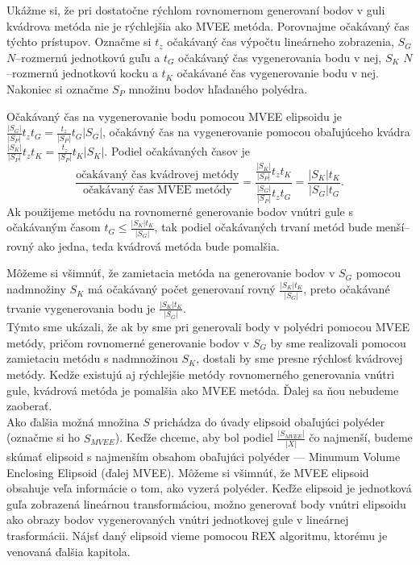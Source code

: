 Ukážme si, že pri dostatočne rýchlom rovnomernom generovaní bodov v guli kvádrova metóda nie je rýchlejšia ako MVEE metóda. Porovnajme očakávaný čas týchto prístupov. Označme si $t_z$ očakávaný čas výpočtu lineárneho zobrazenia, $S_G$ $N$--rozmernú jednotkovú guľu a $t_G$ očakávaný čas vygenerovania bodu v nej, $S_K$ $N$--rozmernú jednotkovú kocku a $t_K$ očakávané čas vygenerovanie bodu v nej. Nakoniec si označme $S_P$ množinu bodov hľadaného polyédra.

Očakávaný čas na vygenerovanie bodu pomocou MVEE elipsoidu je $\frac{|S_G|}{|S_P|}t_zt_G=\frac{t_z}{|S_P|}t_G|S_G|$, očakávný čas na vygenerovanie pomocou obaľujúceho kvádra $\frac{|S_K|}{|S_P|}t_zt_K=\frac{t_z}{|S_P|}t_K|S_K|$.
Podiel očakávaných časov je $$\frac{\text{očakávaný čas kvádrovej metódy}}{\text{očakávaný čas MVEE metódy}}=\frac{\frac{|S_K|}{|S_P|}t_zt_K}{\frac{|S_G|}{|S_P|}t_zt_G}=\frac{|S_K|t_K}{|S_G|t_G}.$$ Ak použijeme metódu na rovnomerné generovanie bodov vnútri gule s očakávaným časom $t_G \le \frac{|S_K|t_K}{|S_G|}$, tak podiel očakávaných trvaní metód bude menší--rovný ako jedna, teda kvádrová metóda bude pomalšia.

Môžeme si všimnúť, že zamietacia metóda na generovanie bodov v $S_G$ pomocou nadmnožiny $S_K$ má očakávaný počet generovaní rovný $\frac{|S_K|t_K}{|S_G|}$, preto očakávané trvanie vygenerovania bodu je $\frac{|S_K|t_K}{|S_G|}$.\\

Týmto sme ukázali, že ak by sme pri generovali body v polyédri pomocou MVEE metódy, pričom rovnomerné generovanie bodov v $S_G$ by sme realizovali pomocou zamietaciu metódu s nadmnožinou $S_K$, dostali by sme presne rýchlosť kvádrovej metódy. Kedže existujú aj rýchlejšie metódy rovnomerného generovania vnútri gule, kvádrová metóda je pomalšia ako MVEE metóda. Ďalej sa ňou nebudeme zaoberať.\\



Ako ďalšia možná množina $S$ prichádza do úvady elipsoid obaľujúci polyéder (označme si ho $S_{MVEE}$). Keďže chceme, aby bol podiel $\frac{|S_{MVEE}|}{|X|}$ čo najmenší, budeme skúmať elipsoid s najmenším obsahom obaľujúci polyéder --- Minumum Volume Enclosing Elipsoid (ďalej MVEE). Môžeme si všimnúť, že MVEE elipsoid obsahuje veľa informácie o tom, ako vyzerá polyéder. Keďže elipsoid je jednotková guľa zobrazená lineárnou transformáciou, možno generovať body vnútri elipsoidu ako obrazy bodov vygenerovaných vnútri jednotkovej gule v lineárnej trasformácii. Nájsť daný elipsoid vieme pomocou REX algoritmu, ktorému je venovaná ďalšia kapitola.\\

